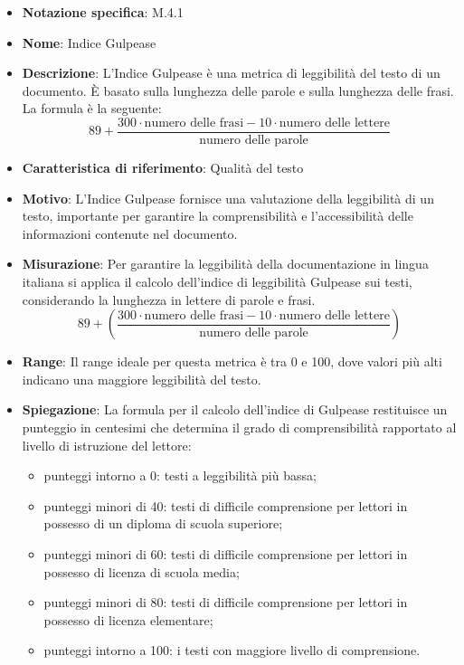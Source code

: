 \begin{itemize}
    \item \textbf{Notazione specifica}: M.4.1
    \item \textbf{Nome}: Indice Gulpease
    \item \textbf{Descrizione}: L'Indice Gulpease è una metrica di leggibilità del testo di un documento. È basato sulla lunghezza delle parole e sulla lunghezza delle frasi. La formula è la seguente: \[ 89+\frac{300 \cdot \text{{numero delle frasi}} - 10 \cdot \text{{numero delle lettere}}}{\text{{numero delle parole}}} \]
    \item \textbf{Caratteristica di riferimento}: Qualità del testo
    \item \textbf{Motivo}: L'Indice Gulpease fornisce una valutazione della leggibilità di un testo, importante per garantire la comprensibilità e l'accessibilità delle informazioni contenute nel documento.
    \item \textbf{Misurazione}: Per garantire la leggibilità della documentazione in lingua italiana si applica il calcolo dell’indice di leggibilità Gulpease sui testi, considerando la lunghezza in lettere di parole e frasi.
    \[ 89 + \left( \frac{{300 \cdot \text{{numero delle frasi}} - 10 \cdot \text{{numero delle lettere}}}}{{\text{{numero delle parole}}}} \right) \]
    \item \textbf{Range}: Il range ideale per questa metrica è tra 0 e 100, dove valori più alti indicano una maggiore leggibilità del testo.
    \item \textbf{Spiegazione}: La formula per il calcolo dell’indice di Gulpease restituisce un punteggio in centesimi che determina il grado di comprensibilità rapportato al livello di istruzione del lettore:
    \begin{itemize}
        \item punteggi intorno a 0: testi a leggibilità più bassa;
        \item punteggi minori di 40: testi di difficile comprensione per lettori in possesso di un diploma di scuola superiore;
        \item punteggi minori di 60: testi di difficile comprensione per lettori in possesso di licenza di scuola media;
        \item punteggi minori di 80: testi di difficile comprensione per lettori in possesso di licenza elementare;
        \item punteggi intorno a 100: i testi con maggiore livello di comprensione.
    \end{itemize}
\end{itemize}
